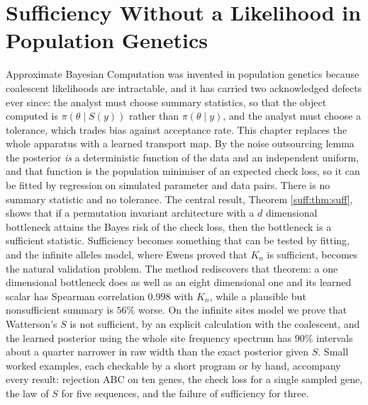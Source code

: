 \DeclareRobustCommand{\E}{\mathbb{E}}
\DeclareRobustCommand{\Prob}{\mathbb{P}}
\DeclareRobustCommand{\R}{\mathbb{R}}
\DeclareRobustCommand{\Th}{\Theta}
\DeclareRobustCommand{\Var}{\mathrm{Var}}
\DeclareRobustCommand{\Be}{\mathrm{Be}}
\DeclareRobustCommand{\Cov}{\mathrm{Cov}}
\DeclareRobustCommand{\Ycal}{\mathcal{Y}}
\DeclareRobustCommand{\dd}{\,\mathrm{d}}
\chapter{Sufficiency Without a Likelihood in Population Genetics}\label{ch:suff}
\begin{chaptersummary}
Approximate Bayesian Computation was invented in population genetics because coalescent
likelihoods are intractable, and it has carried two acknowledged defects ever since: the
analyst must choose summary statistics, so that the object computed is
$\pi(\theta\mid S(y))$ rather than $\pi(\theta\mid y)$, and the analyst must choose a
tolerance, which trades bias against acceptance rate. This chapter replaces the whole
apparatus with a learned transport map. By the noise outsourcing lemma the posterior
\emph{is} a deterministic function of the data and an independent uniform, and that function
is the population minimiser of an expected check loss, so it can be fitted by regression on
simulated parameter and data pairs. There is no summary statistic and no tolerance. The
central result, Theorem \ref{suff:thm:suff}, shows that if a permutation invariant
architecture with a $d$ dimensional bottleneck attains the Bayes risk of the check loss,
then the bottleneck is a sufficient statistic. Sufficiency becomes something that can be
tested by fitting, and the infinite alleles model, where Ewens proved that $K_n$ is
sufficient, becomes the natural validation problem. The method rediscovers that theorem: a
one dimensional bottleneck does as well as an eight dimensional one and its learned scalar
has Spearman correlation $0.998$ with $K_n$, while a plausible but nonsufficient summary is
$56\%$ worse. On the infinite sites model we prove that Watterson's $S$ is not sufficient,
by an explicit calculation with the coalescent, and the learned posterior using the whole
site frequency spectrum has $90\%$ intervals about a quarter narrower in raw width than the exact
posterior given $S$. Small worked examples, each checkable by a short program or by hand, accompany every result:
rejection ABC on ten genes, the check loss for a single sampled gene, the law of $S$ for five
sequences, and the failure of sufficiency for three.
\end{chaptersummary}

